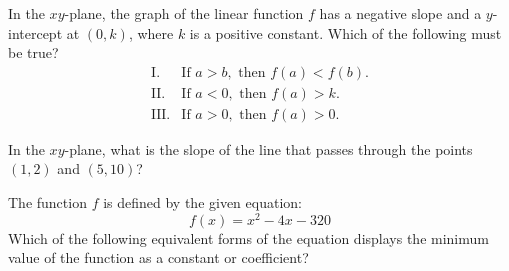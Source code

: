 \vspace{0.75em}



\vspace{2em}

\newpage

\noindent\markforreview
\vspace{1em}
\vspace{1em}

In the \(xy\)-plane, the graph of the linear function \(f\) has a negative slope
and a \(y\)-intercept at \((0,k)\), where \(k\) is a positive constant. Which of
the following must be true?
\[
\begin{array}{ll}
\text{I.} & \text{If }a>b,\text{ then }f(a)<f(b).\\
\text{II.} & \text{If }a<0,\text{ then }f(a)>k.\\
\text{III.} & \text{If }a>0,\text{ then }f(a)>0.
\end{array}
\]

\vspace{2em}

\noindent\markforreview
\vspace{1em}
\vspace{1em}

In the \(xy\)-plane, what is the slope of the line that passes through the points \((1,2)\) and \((5,10)\)?

\vspace{0.75em}


\newpage

\newpage

\noindent\markforreview
\vspace{1em}
\vspace{1em}

The function $f$ is defined by the given equation: 
\[
f(x) = x^2 - 4x - 320
\]
Which of the following equivalent forms of the equation displays the minimum value of the function as a constant or coefficient?

\vspace{0.75em}

